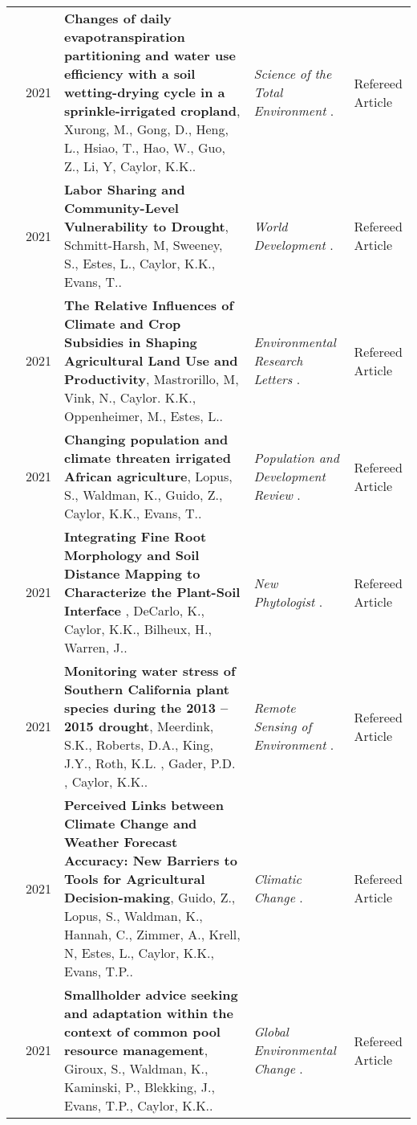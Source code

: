 \begin{longtable}{lcp{7.75cm}>{\raggedright}p{5.25cm}p{1.75cm}}
     & 2021 & {\bf Changes of daily evapotranspiration partitioning and  water use efficiency with a soil wetting-drying cycle in a sprinkle-irrigated cropland}, Xurong, M., Gong, D., Heng, L., Hsiao, T., Hao, W., Guo, Z., Li, Y, Caylor, K.K..  & \emph{ Science of the Total Environment } .   & Refereed Article\\
     & 2021 & {\bf Labor Sharing and Community-Level Vulnerability to Drought}, Schmitt-Harsh, M, Sweeney, S., Estes, L., Caylor, K.K., Evans, T..  & \emph{ World Development } .   & Refereed Article\\
     & 2021 & {\bf The Relative Influences of Climate and Crop Subsidies in Shaping Agricultural Land Use and Productivity}, Mastrorillo, M, Vink, N., Caylor. K.K., Oppenheimer, M., Estes, L..  & \emph{ Environmental Research Letters } .   & Refereed Article\\
     & 2021 & {\bf Changing population and climate threaten irrigated African agriculture}, Lopus, S., Waldman, K., Guido, Z., Caylor, K.K., Evans, T..  & \emph{ Population and Development Review } .   & Refereed Article\\
     & 2021 & {\bf Integrating Fine Root Morphology and Soil Distance Mapping to Characterize the Plant-Soil Interface }, DeCarlo, K., Caylor, K.K., Bilheux, H., Warren, J..  & \emph{ New Phytologist } .   & Refereed Article\\
     & 2021 & {\bf Monitoring water stress of Southern California plant species during the 2013 – 2015 drought}, Meerdink, S.K., Roberts, D.A., King, J.Y., Roth, K.L. , Gader, P.D. , Caylor, K.K..  & \emph{ Remote Sensing of Environment } .   & Refereed Article\\
     & 2021 & {\bf Perceived Links between Climate Change and Weather Forecast Accuracy: New Barriers to Tools for Agricultural Decision-making}, Guido, Z., Lopus, S., Waldman, K., Hannah, C., Zimmer, A., Krell, N, Estes, L., Caylor, K.K., Evans, T.P..  & \emph{ Climatic Change } .   & Refereed Article\\
     & 2021 & {\bf Smallholder advice seeking and adaptation within the context of common pool resource management}, Giroux, S., Waldman, K., Kaminski, P., Blekking, J., Evans, T.P., Caylor, K.K..  & \emph{ Global Environmental Change } .   & Refereed Article\\
\end{longtable}
